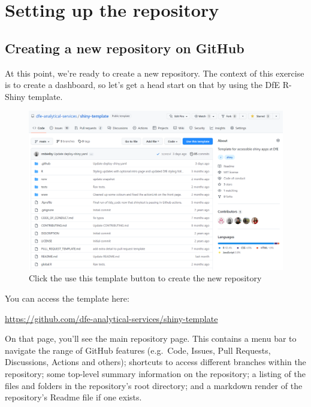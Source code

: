 \documentclass[
  12pt,
]{article}
\begin{document}
\newpage

\hypertarget{setting-up-the-repository}{%
\section{Setting up the repository}\label{setting-up-the-repository}}

\hypertarget{creating-a-new-repository-on-github}{%
\subsection{Creating a new repository on
GitHub}\label{creating-a-new-repository-on-github}}

At this point, we're ready to create a new repository. The context of
this exercise is to create a dashboard, so let's get a head start on
that by using the DfE R-Shiny template.

\begin{figure}
\centering
\includegraphics{images/gitdemo/gitdemo-shinydash-template.png}
\caption{Click the use this template button to create the new
repository}
\end{figure}

You can access the template here:

\url{https://github.com/dfe-analytical-services/shiny-template}

On that page, you'll see the main repository page. This contains a menu
bar to navigate the range of GitHub features (e.g.~Code, Issues, Pull
Requests, Discussions, Actions and others); shortcuts to access
different branches within the repository; some top-level summary
information on the repository; a listing of the files and folders in the
repository's root directory; and a markdown render of the repository's
Readme file if one exists.
\end{document}
